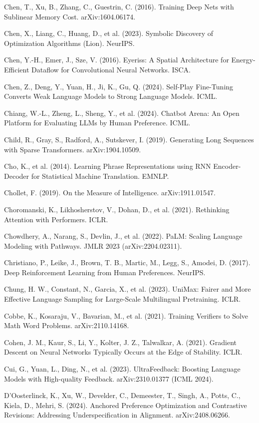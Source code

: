 {\begin{enumerate}[leftmargin=*,itemsep=1pt,label={[\arabic*]}]
\item Chen, T., Xu, B., Zhang, C., Guestrin, C. (2016). Training Deep Nets with Sublinear Memory Cost. arXiv:1604.06174.
\item Chen, X., Liang, C., Huang, D., et al. (2023). Symbolic Discovery of Optimization Algorithms (Lion). NeurIPS.
\item Chen, Y.-H., Emer, J., Sze, V. (2016). Eyeriss: A Spatial Architecture for Energy-Efficient Dataflow for Convolutional Neural Networks. ISCA.
\item Chen, Z., Deng, Y., Yuan, H., Ji, K., Gu, Q. (2024). Self-Play Fine-Tuning Converts Weak Language Models to Strong Language Models. ICML.
\item Chiang, W.-L., Zheng, L., Sheng, Y., et al. (2024). Chatbot Arena: An Open Platform for Evaluating LLMs by Human Preference. ICML.
\item Child, R., Gray, S., Radford, A., Sutskever, I. (2019). Generating Long Sequences with Sparse Transformers. arXiv:1904.10509.
\item Cho, K., et al. (2014). Learning Phrase Representations using RNN Encoder-Decoder for Statistical Machine Translation. EMNLP.
\item Chollet, F. (2019). On the Measure of Intelligence. arXiv:1911.01547.
\item Choromanski, K., Likhosherstov, V., Dohan, D., et al. (2021). Rethinking Attention with Performers. ICLR.
\item Chowdhery, A., Narang, S., Devlin, J., et al. (2022). PaLM: Scaling Language Modeling with Pathways. JMLR 2023 (arXiv:2204.02311).
\item Christiano, P., Leike, J., Brown, T. B., Martic, M., Legg, S., Amodei, D. (2017). Deep Reinforcement Learning from Human Preferences. NeurIPS.
\item Chung, H. W., Constant, N., Garcia, X., et al. (2023). UniMax: Fairer and More Effective Language Sampling for Large-Scale Multilingual Pretraining. ICLR.
\item Cobbe, K., Kosaraju, V., Bavarian, M., et al. (2021). Training Verifiers to Solve Math Word Problems. arXiv:2110.14168.
\item Cohen, J. M., Kaur, S., Li, Y., Kolter, J. Z., Talwalkar, A. (2021). Gradient Descent on Neural Networks Typically Occurs at the Edge of Stability. ICLR.
\item Cui, G., Yuan, L., Ding, N., et al. (2023). UltraFeedback: Boosting Language Models with High-quality Feedback. arXiv:2310.01377 (ICML 2024).
\item D'Oosterlinck, K., Xu, W., Develder, C., Demeester, T., Singh, A., Potts, C., Kiela, D., Mehri, S. (2024). Anchored Preference Optimization and Contrastive Revisions: Addressing Underspecification in Alignment. arXiv:2408.06266.

\end{enumerate}}

